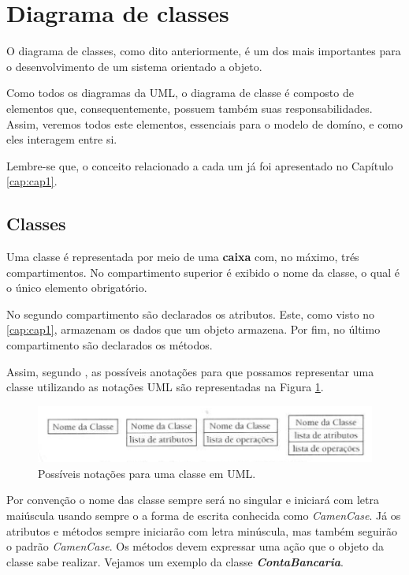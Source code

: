 \section{Diagrama de classes}

O diagrama de classes, como dito anteriormente, é um dos mais importantes para o desenvolvimento de um sistema orientado a objeto. 

Como todos os diagramas da UML, o diagrama de classe é composto de elementos que, consequentemente, possuem também suas responsabilidades. Assim, veremos todos este elementos, essenciais para o modelo de domíno, e como eles interagem entre si.

Lembre-se que, o conceito relacionado a cada um já foi apresentado no Capítulo \ref{cap:cap1}.

\subsection{Classes}

Uma classe é representada por meio de uma \textbf{caixa} com, no máximo, trés compartimentos. No compartimento superior é exibido o nome da classe, o qual é o único elemento obrigatório. 

No segundo compartimento são declarados os atributos. Este, como visto no \ref{cap:cap1}, armazenam os dados que um objeto armazena. Por fim, no último compartimento são declarados os métodos. 

Assim, segundo , as possíveis anotações para que possamos representar uma classe utilizando as notações UML são representadas na Figura \ref{fig:notacoes-uml-diagrama-de-classes}.

\begin{figure}[H]
	\centering
	\includegraphics[scale=0.5]{imagens/notacoes-uml-classes.png}
	\caption{Possíveis notações para uma classe em UML.}
	\label{fig:notacoes-uml-diagrama-de-classes}
\end{figure} 

Por convenção o nome das classe sempre será no singular e iniciará com letra maiúscula usando sempre o a forma de escrita conhecida como \textit{CamenCase}. Já os atributos e métodos sempre iniciarão com letra minúscula, mas também seguirão o padrão \textit{CamenCase}. Os métodos devem expressar uma ação que o objeto da classe sabe realizar. Vejamos um exemplo da classe \textbf{\textit{ContaBancaria}}.

